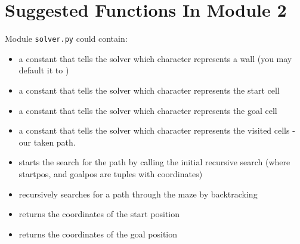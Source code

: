 \section{Suggested Functions In Module 2}
Module \texttt{solver.py} could contain:
\begin{itemize}
	\item {} a constant that tells the solver which character
	      represents a wall (you may default it to \pythoninline{#})
	\item {} a constant that tells the solver which character
	      represents the start cell
	\item {} a constant that tells the solver which character
          represents the goal cell
    \item {} a constant that tells the solver which character
        represents the visited cells - our taken path.
	\item {} starts the search for
	      the path by calling the initial recursive search (where startpos,
	      and goalpos are tuples with coordinates)
	\item {} recursively
	      searches for a path through the maze by backtracking
	\item {} returns the coordinates of the start
	      position
	\item {} returns the coordinates of the goal position
\end{itemize}
\pagebreak

